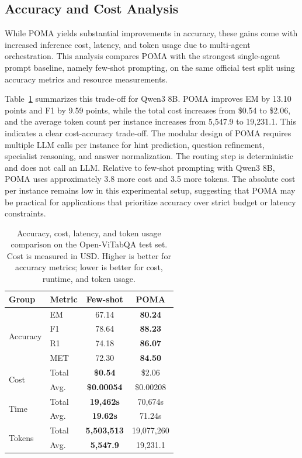 \documentclass[]{interact}
\begin{document}
\subsection{Accuracy and Cost Analysis}

While POMA yields substantial improvements in accuracy, these gains come with increased inference cost, latency, and token usage due to multi-agent orchestration. This analysis compares POMA with the strongest single-agent prompt baseline, namely few-shot prompting, on the same official test split using accuracy metrics and resource measurements.

Table~\ref{tab:accuracy-cost-analysis} summarizes this trade-off for Qwen3 8B. POMA improves EM by 13.10 points and F1 by 9.59 points, while the total cost increases from \$0.54 to \$2.06, and the average token count per instance increases from 5,547.9 to 19,231.1. This indicates a clear cost-accuracy trade-off. The modular design of POMA requires multiple LLM calls per instance for hint prediction, question refinement, specialist reasoning, and answer normalization. The routing step is deterministic and does not call an LLM. Relative to few-shot prompting with Qwen3 8B, POMA uses approximately 3.8\texttimes{} more cost and 3.5\texttimes{} more tokens. The absolute cost per instance remains low in this experimental setup, suggesting that POMA may be practical for applications that prioritize accuracy over strict budget or latency constraints.

\begin{table}[!t]
\centering
\small
\setlength{\tabcolsep}{10pt}
\caption{Accuracy, cost, latency, and token usage comparison on the Open-ViTabQA test set. Cost is measured in USD. Higher is better for accuracy metrics; lower is better for cost, runtime, and token usage.}
\label{tab:accuracy-cost-analysis}
\begin{tabular}{llcc}
\toprule
{\textbf{Group}}
& {\textbf{Metric}}
& \textbf{Few-shot} & \textbf{POMA} \\
\midrule
\multirow{4}{*}{Accuracy}
& EM & 67.14 & \textbf{80.24} \\
& F1 & 78.64 & \textbf{88.23} \\
& R1 & 74.18 & \textbf{86.07} \\
& MET & 72.30 & \textbf{84.50} \\
\midrule
\multirow{2}{*}{Cost}
& Total & \textbf{\$0.54} & \$2.06 \\
& Avg. & \textbf{\$0.00054} & \$0.00208 \\
\midrule
\multirow{2}{*}{Time}
& Total & \textbf{19,462s} & 70,674s \\
& Avg. & \textbf{19.62s} & 71.24s \\
\midrule
\multirow{2}{*}{Tokens}
& Total & \textbf{5,503,513} & 19,077,260 \\
& Avg. & \textbf{5,547.9} & 19,231.1 \\
\bottomrule
\end{tabular}
\end{table}
\end{document}
